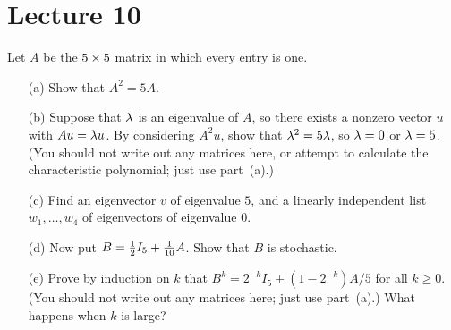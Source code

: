 \documentclass[a4paper]{amsart}
\begin{document}
\section{Lecture 10}

\begin{exercise}\label{ex-powers-i}
 Let $A$ be the $5\times 5$ matrix in which every entry is one.
 \begin{itemize}
  \item[(a)] Show that $A^2=5A$.
  \item[(b)] Suppose that $\lambda$ is an eigenvalue of $A$, so there
   exists a nonzero vector $u$ with $Au=\lambda u$.  By considering
   $A^2u$, show that $\lambda^2=5\lambda$, so $\lambda=0$ or $\lambda=5$. (You should
   not write out any matrices here, or attempt to calculate the
   characteristic polynomial; just use part~(a).)
  \item[(c)] Find an eigenvector $v$ of eigenvalue $5$, and a linearly
   independent list $w_1,\dotsc,w_4$ of eigenvectors of eigenvalue
   $0$.
  \item[(d)] Now put $B=\tfrac{1}{2} I_5 + \tfrac{1}{10}A$.  Show that $B$ is
   stochastic.
  \item[(e)] Prove by induction on $k$ that
   $B^k=2^{-k}I_5+(1-2^{-k})A/5$ for all $k\geq 0$.  (You should not
   write out any matrices here; just use part~(a).)  What happens when
   $k$ is large?
 \end{itemize}
\end{exercise}
\end{document}
